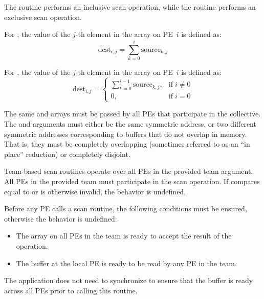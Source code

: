 \begin{apidefinition}
{  The  routine performs an inclusive scan
  operation, while the  routine performs an
  exclusive scan operation.  

  For , the value of the $j$-th element in
  the  array on \ac{PE}~$i$ is defined as:
  \begin{equation*}
    \textrm{dest}_{i,j} = \displaystyle\sum_{k=0}^{i} \textrm{source}_{k,j}
  \end{equation*}

  For , the value of the $j$-th element in
  the  array on \ac{PE}~$i$ is defined as:
  \begin{equation*}
    \textrm{dest}_{i,j} =
    \begin{cases}
    \displaystyle\sum_{k=0}^{i-1} \textrm{source}_{k,j}, & \text{if} \; i \neq 0 \\
    0,  & \text{if} \; i = 0
    \end{cases}
  \end{equation*}


  The same \source{} and \dest{} arrays must be passed by all PEs that
  participate in the collective.
  The \source{} and \dest{} arguments must either be the same
  symmetric address, or two different symmetric addresses
  corresponding to buffers that do not overlap in memory.
  That is, they must be completely overlapping (sometimes referred to as an
  ``in place'' reduction) or completely disjoint.

  Team-based scan routines operate over all \acp{PE} in the provided
  team argument. All \acp{PE} in the provided team must participate in
  the scan operation.  If  compares equal to
   or is otherwise invalid, the
  behavior is undefined.

  Before any \ac{PE} calls a scan routine, the following conditions must be
  ensured, otherwise the behavior is undefined:
  \begin{itemize}
      \item The \dest{} array on all \acp{PE} in the team is ready to accept
          the result of the operation.
      \item The \source{} buffer at the local \ac{PE} is ready to be read by
          any \ac{PE} in the team.
  \end{itemize}
  The application does not need to synchronize to ensure that the \source{}
  buffer is ready across all \acp{PE} prior to calling this routine.
  
}
\end{apidefinition}
